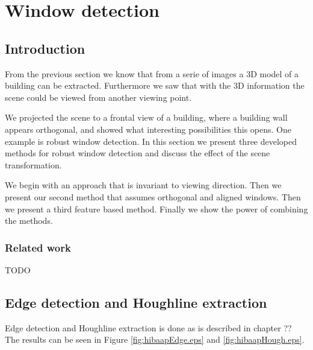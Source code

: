 %
%
\section{Window detection}







\label{chap:windowDetection}
\subsection{Introduction}
From the previous section we know that from a serie of images a 3D model of a
building can be extracted. Furthermore we saw that with the 3D information the
scene could be viewed from another viewing point. 

We projected the scene to a frontal view of a building, where a building wall appears
orthogonal, and showed what interesting possibilities this opens.
One example is robust window detection.
In this section we present three developed methods for robust window detection
and discuss the effect of the scene transformation.

We begin with an approach that is invariant to viewing direction.  Then we
present our second method that assumes orthogonal and aligned windows.  Then we
present a third feature based method.  Finally we show the power of combining
the methods.



\subsubsection{Related work}
TODO

\subsection{Edge detection and Houghline extraction} 
Edge detection and Houghline extraction is done as is described in chapter ??
The results can be seen in Figure \ref{fig:hibaapEdge.eps} and
\ref{fig:hibaapHough.eps}.
